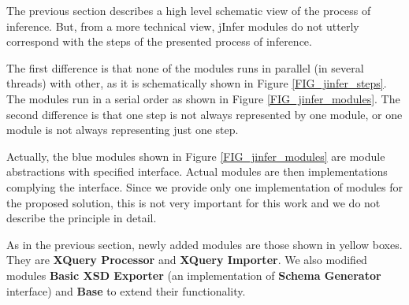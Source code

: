 The previous section describes a high level schematic view of the process of inference. But, from a more technical view, jInfer modules do not utterly correspond with the steps of the presented process of inference.

The first difference is that none of the modules runs in parallel (in several threads) with other, as it is schematically shown in Figure \ref{FIG_jinfer_steps}. The modules run in a serial order as shown in Figure \ref{FIG_jinfer_modules}. The second difference is that one step is not always represented by one module, or one module is not always representing just one step.

Actually, the blue modules shown in Figure \ref{FIG_jinfer_modules} are module abstractions with specified interface. Actual modules are then implementations complying the interface. Since we provide only one implementation of modules for the proposed solution, this is not very important for this work and we do not describe the principle in detail.

As in the previous section, newly added modules are those shown in yellow boxes. They are \textbf{XQuery Processor} and \textbf{XQuery Importer}. We also modified modules \textbf{Basic XSD Exporter} (an implementation of \textbf{Schema Generator} interface) and \textbf{Base} to extend their functionality.

